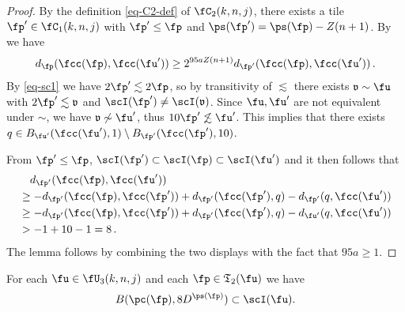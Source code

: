 \begin{proof}
    By the definition \eqref{eq-C2-def} of $\fC_2(k,n,j)$, there exists a tile $\fp' \in \fC_1(k,n,j)$ with $\fp' \le \fp$ and $\ps(\fp') = \ps(\fp)- Z(n+1)$.
    By  we have
    $$
        d_{\fp}(\fcc(\fp), \fcc(\fu')) \ge 2^{95a Z(n+1)} d_{\fp'}(\fcc(\fp), \fcc(\fu'))\,.
    $$
    By \eqref{eq-sc1} we have $2\fp' \lesssim 2\fp$, so by transitivity of $\lesssim$ there exists $\mathfrak{v} \sim \fu$ with $2\fp' \lesssim \mathfrak{v}$ and $\scI(\fp') \ne \scI(\mathfrak{v})$. Since $\fu, \fu'$ are not equivalent under $\sim$, we have $\mathfrak{v} \not \sim \fu'$, thus $10\fp' \not\lesssim \fu'$. This implies that there exists $q \in B_{\fu'}(\fcc(\fu'), 1) \setminus B_{\fp'}(\fcc(\fp'), 10)$.

    From $\fp' \le \fp$, $\scI(\fp') \subset \scI(\fp) \subset \scI(\fu')$ and  it then follows that
    \begin{align*}
        &\quad d_{\fp'}(\fcc(\fp), \fcc(\fu'))\\
        &\ge -d_{\fp'}(\fcc(\fp), \fcc(\fp')) + d_{\fp'}(\fcc(\fp'), q) - d_{\fp'}(q, \fcc(\fu'))\\
        &\ge -d_{\fp'}(\fcc(\fp), \fcc(\fp')) + d_{\fp'}(\fcc(\fp'), q) - d_{\fu'}(q, \fcc(\fu'))\\
        &> -1 + 10 - 1 = 8\,.
    \end{align*}
    The lemma follows by combining the two displays with the fact that $95 a \ge 1$.
\end{proof}

\begin{lemma}
    \label{forest-inner}
    \leanok
    For each $\fu\in \fU_3(k,n,j)$
    and each $\fp \in \mathfrak{T}_2(\fu)$
    we have
    \begin{equation}
        B(\pc(\fp), 8 D^{\ps(\fp)}) \subset \scI(\fu).
    \end{equation}
\end{lemma}

